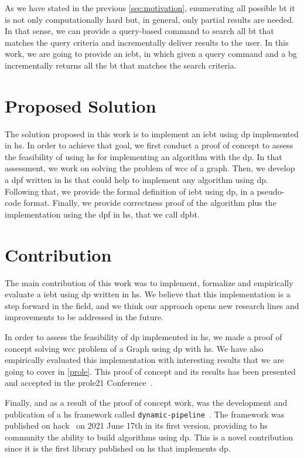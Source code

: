 As we have stated in the previous \autoref{sec:motivation}, enumerating all possible \acrshort{bt} it is not only computationally hard but, in general, only partial results are needed.
In that sense, we can provide a query-based command to search all \acrshort{bt} that matches the query criteria and incrementally deliver results to the user.
In this work, we are going to provide an \acrfull{iebt}, in which given a query command and a \acrlong{bg} incrementally returns all the \acrlong{bt} that matches the search criteria.

\section{Proposed Solution}
The solution proposed in this work is to implement an \acrfull{iebt} using \acrfull{dp} implemented in \acrfull{hs}.
In order to achieve that goal, we first conduct a proof of concept to assess the feasibility of using \acrshort{hs} for implementing an algorithm with the \acrshort{dp}.
In that assessment, we work on solving the problem of \acrfull{wcc} of a graph. Then, we develop a \acrlong{dpf} written in \acrlong{hs} that could help to implement any algorithm using \acrshort{dp}.
Following that, we provide the formal definition of \acrshort{iebt} using \acrshort{dp}, in a pseudo-code format. 
Finally, we provide correctness proof of the algorithm plus the implementation using the \acrshort{dpf} in \acrshort{hs}, that we call \acrfull{dpbt}.

\section{Contribution}\label{sec:contrib}
The main contribution of this work was to implement, formalize and empirically evaluate a \acrlong{iebt} using \acrlong{dp} written in \acrshort{hs}.
We believe that this implementation is a step forward in the field, and we think our approach opens new research lines and improvements to be addressed in the future. 

In order to assess the feasibility of \acrshort{dp} implemented in \acrshort{hs}, we made a proof of concept solving \acrfull{wcc} problem of a Graph 
using \acrshort{dp} with \acrshort{hs}. We have also empirically evaluated this implementation with interesting results that we are going to cover in \autoref{prole}. 
This proof of concept and its results has been presented and accepted in the \acrfull{prole21} Conference~\cite{prole21}. 

Finally, and as a result of the proof of concept work, was the development and publication of a \acrshort{hs} framework called \texttt{dynamic-pipeline}~\cite{dynamic-pipeline}. 
The framework was published on \acrfull{hack}~\cite{hackage} on 2021 June 17th in its first version,
providing to \acrshort{hs} community the ability to build algorithms using \acrshort{dp}. This is a novel contribution since it is the first library published on \acrshort{hs}
that implements \acrshort{dp}.


